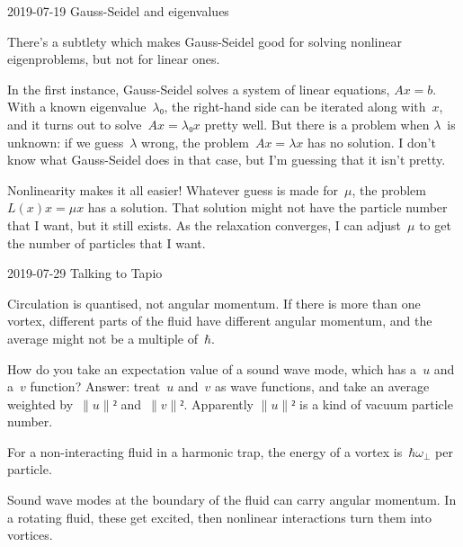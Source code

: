 2019-07-19 Gauss-Seidel and eigenvalues

There's a subtlety which makes Gauss-Seidel good for solving nonlinear eigenproblems, but not for linear ones.

In the first instance, Gauss-Seidel solves a system of linear equations, $Ax=b$.  With a known eigenvalue~$λ₀$, the right-hand side can be iterated along with~$x$, and it turns out to solve~$Ax=λ₀x$ pretty well.  But there is a problem when $λ$~is unknown: if we guess~$λ$ wrong, the problem~$Ax=λx$ has no solution.  I don't know what Gauss-Seidel does in that case, but I'm guessing that it isn't pretty.

Nonlinearity makes it all easier!  Whatever guess is made for~$μ$, the problem~$L(x)x=μx$ has a solution.  That solution might not have the particle number that I want, but it still exists.  As the relaxation converges, I can adjust~$μ$ to get the number of particles that I want.

2019-07-29 Talking to Tapio

Circulation is quantised, not angular momentum.  If there is more than one vortex, different parts of the fluid have different angular momentum, and the average might not be a multiple of~$ℏ$.

How do you take an expectation value of a sound wave mode, which has a~$u$ and a~$v$ function?  Answer: treat~$u$ and~$v$ as wave functions, and take an average weighted by~$∥u∥²$ and~$∥v∥²$.  Apparently $∥u∥²$ is a kind of vacuum particle number.

For a non-interacting fluid in a harmonic trap, the energy of a vortex is~$ℏω_\perp$ per particle.

Sound wave modes at the boundary of the fluid can carry angular momentum.  In a rotating fluid, these get excited, then nonlinear interactions turn them into vortices.


\bye